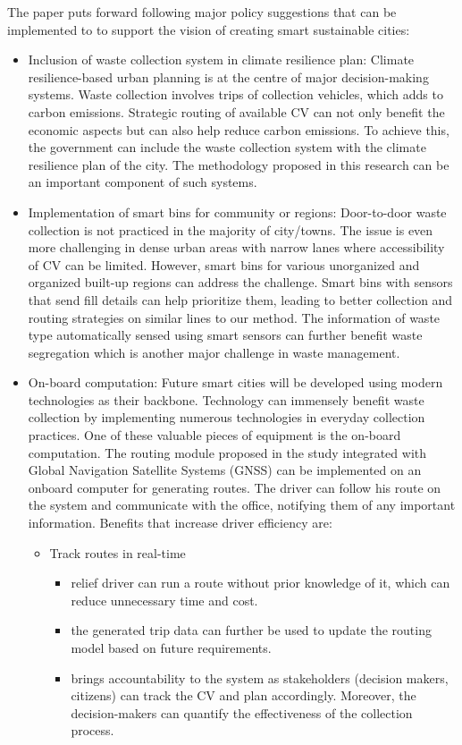 \documentclass[12pt]{article}
\begin{document}
The paper puts forward following major policy suggestions that can be implemented to to support the vision of creating smart sustainable cities:

\begin{itemize}
\item Inclusion of waste collection system in climate resilience plan: Climate resilience-based urban planning is at the centre of major decision-making systems. Waste collection involves trips of collection vehicles, which adds to carbon emissions. Strategic routing of available CV can not only benefit the economic aspects but can also help reduce carbon emissions. To achieve this, the government can include the waste collection system with the climate resilience plan of the city. The methodology proposed in this research can be an important component of such systems.
    
\item Implementation of smart bins for community or regions:  Door-to-door waste collection is not practiced in the majority of city/towns. The issue is even more challenging in dense urban areas with narrow lanes where accessibility of CV can be limited. However, smart bins for various unorganized and organized built-up regions can address the challenge. Smart bins with sensors that send fill details can help prioritize them, leading to better collection and routing strategies on similar lines to our method. The information of waste type automatically sensed using smart sensors can further benefit waste segregation which is another major challenge in waste management.\parencite{actionplan}

 \item On-board computation: Future smart cities will be developed using modern technologies as their backbone. Technology can immensely benefit waste collection by implementing numerous technologies in everyday collection practices. One of these valuable pieces of equipment is the on-board computation. The routing module proposed in the study integrated with Global Navigation Satellite Systems (GNSS) can be implemented on an onboard computer for generating routes. The driver can follow his route on the system and communicate with the office, notifying them of any important information. Benefits that increase driver efficiency are:
 \begin{itemize}
 \item Track routes in real-time
   \begin{itemize}
 \item relief driver can run a route without prior knowledge of it, which can reduce unnecessary time and cost.\item the generated trip data can further be used to update the routing model based on future requirements.
   \item brings accountability to the system as stakeholders (decision makers, citizens) can track the CV and plan accordingly. Moreover, the decision-makers can quantify the effectiveness of the collection process. 
    

\end{itemize}
\end{itemize}
\end{itemize}
\end{document}
